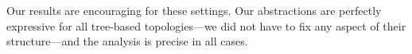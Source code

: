 \documentclass[numbers, 10pt]{sigplanconf}
\newcommand{\EG}{\emph{e.g.}}
\newcommand{\para}[1]{\paragraph*{\textbf{#1}}}
\begin{document}
Our results are encouraging for these settings. Our abstractions are perfectly expressive for all tree-based topologies---we did not have to fix any aspect of their structure---and the analysis is precise in all cases.



%
\end{document}
